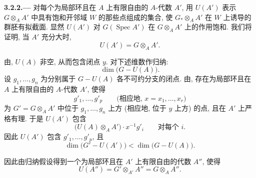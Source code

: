 
\medskip
{}\label{par:sga3-VIA-3.2.2}%
\noindent\textbf{3.2.2.---}
对每个为局部环且在 \(A\) 上有限自由的 \(A\)-代数 \(A'\),
用 \(U(A')\) 表示 \(G\otimes_AA'\) 中具有饱和开邻域 \(W\) 的那些点组成的集合,
使 \(G_*\otimes_AA'\) 在 \(W\) 上诱导的群胚有拟截面.
显然 \(U(A')\) 对 \(G(\operatorname{Spec}A')\) 在 \(G\otimes_AA'\) 上的作用饱和.
我们将证明, 当 \(A'\) 充分大时,
\[
  U(A')=G\otimes_AA'.
\]

由, \(U(A)\) 非空,
从而包含闭点 \(y\). 对下述维数作归纳:
\[
  \dim\bigl(G-U(A)\bigr).
\]
设 \(g_1,\ldots,g_n\) 为分别属于 \(G-U(A)\) 各不可约分支的闭点.
由,
存在为局部环且在 \(A\) 上有限自由的 \(A\)-代数 \(A'\), 使得
\[
  g'_1,\ldots,g'_p
  \qquad
  \bigl(\text{相应地, }x=x_1,\ldots,x_r\bigr)
\]
为 \(G'=G\otimes_AA'\) 中位于 \(g_1,\ldots,g_n\)
上方 (相应地, 位于 \(y\) 上方) 的点, 且在 \(A'\) 上严格有理.
于是 \(U(A')\) 包含
\[
  \bigl(U(A)\otimes_AA'\bigr)\cdot x^{-1}g'_i
  \qquad\text{对每个 }i.
\]
因此 \(U(A')\) 包含 \(g'_1,\ldots,g'_p\), 且
\[
  \dim\bigl(G'-U(A')\bigr)
  <
  \dim\bigl(G-U(A)\bigr).
\]

因此由归纳假设得到一个为局部环且在 \(A'\) 上有限自由的代数 \(A''\), 使得
\[
  U(A'')
  =
  G'\otimes_{A'}A''
  =
  G\otimes_AA''.
\]
